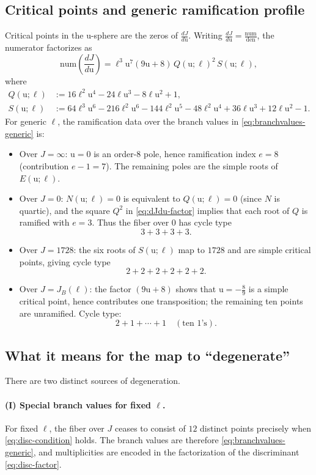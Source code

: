 \documentclass[11pt, a4paper]{article}
\newcommand{\ur}{\mathrm{u}}
\numberwithin{equation}{section}
\begin{document}
\subsection{Critical points and generic ramification profile}
Critical points in the $\ur$-sphere are the zeros of $\frac{dJ}{d\ur}$.
Writing $\frac{dJ}{d\ur}=\frac{\mathrm{num}}{\mathrm{den}}$, the numerator factorizes as
\begin{equation}
\label{eq:dJdu-factor}
\mathrm{num}\!\left(\frac{dJ}{d\ur}\right)
=
\ell^{3}\ur^{7}(9\ur+8)\,Q(\ur;\ell)^2\,S(\ur;\ell),
\end{equation}
where
\begin{align}
\label{eq:Q}
Q(\ur;\ell)&:=16\ell^2\ur^4-24\ell \ur^3-8\ell \ur^2+1,
\\
\label{eq:S}
S(\ur;\ell)&:=64\ell^3\ur^6-216\ell^2\ur^6-144\ell^2\ur^5-48\ell^2\ur^4+36\ell \ur^3+12\ell \ur^2-1.
\end{align}
For generic $\ell$, the ramification data over the branch values in
\eqref{eq:branchvalues-generic} is:
\begin{itemize}
\item Over $J=\infty$: $\ur=0$ is an order-$8$ pole, hence ramification index $e=8$
(contribution $e-1=7$). The remaining poles are the simple roots of $E(\ur;\ell)$.
\item Over $J=0$: $N(\ur;\ell)=0$ is equivalent to $Q(\ur;\ell)=0$ (since $N$ is quartic),
and the square $Q^2$ in \eqref{eq:dJdu-factor} implies that each root of $Q$ is
ramified with $e=3$. Thus the fiber over $0$ has cycle type
\[
3+3+3+3.
\]
\item Over $J=1728$: the six roots of $S(\ur;\ell)$ map to $1728$ and are simple critical
points, giving cycle type
\[
2+2+2+2+2+2.
\]
\item Over $J=J_B(\ell)$: the factor $(9\ur+8)$ shows that $\ur=-\frac{8}{9}$ is a simple
critical point, hence contributes one transposition; the remaining ten points are
unramified. Cycle type:
\[
2+1+\cdots+1 \quad (\text{ten $1$'s}).
\]
\end{itemize}

\subsection{What it means for the map to ``degenerate''}
There are two distinct sources of degeneration.

\paragraph{(I) Special branch values for fixed $\ell$.}
For fixed $\ell$, the fiber over $J$ ceases to consist of $12$ distinct points precisely
when \eqref{eq:disc-condition} holds. The branch values are therefore
\eqref{eq:branchvalues-generic}, and multiplicities are encoded in the factorization of
the discriminant \eqref{eq:disc-factor}.
\end{document}
